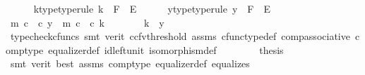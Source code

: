 \begin{isabellebody}
\ \ \ \ \isamarkupfalse%
\ k{\isacharunderscore}{\kern0pt}type{\isacharbrackleft}{\kern0pt}type{\isacharunderscore}{\kern0pt}rule{\isacharbrackright}{\kern0pt}{\isacharcolon}{\kern0pt}\ {\isachardoublequoteopen}k\ {\isacharcolon}{\kern0pt}\ F\ {\isasymrightarrow}\ E{\isacharprime}{\kern0pt}{\isachardoublequoteclose}\isanewline
\ \ \ \ \isamarkupfalse%
\ y{\isacharunderscore}{\kern0pt}type{\isacharbrackleft}{\kern0pt}type{\isacharunderscore}{\kern0pt}rule{\isacharbrackright}{\kern0pt}{\isacharcolon}{\kern0pt}\ {\isachardoublequoteopen}y\ {\isacharcolon}{\kern0pt}\ F\ {\isasymrightarrow}\ E{\isacharprime}{\kern0pt}{\isachardoublequoteclose}\isanewline
\ \ \ \ \isamarkupfalse%
\ {\isachardoublequoteopen}{\isacharparenleft}{\kern0pt}m\ {\isasymcirc}\isactrlsub c\ {\isasymphi}{\isacharparenright}{\kern0pt}\ {\isasymcirc}\isactrlsub c\ y\ {\isacharequal}{\kern0pt}\ {\isacharparenleft}{\kern0pt}m\ {\isasymcirc}\isactrlsub c\ {\isasymphi}{\isacharparenright}{\kern0pt}\ {\isasymcirc}\isactrlsub c\ k{\isachardoublequoteclose}\isanewline
\ \ \ \ \isamarkupfalse%
\ \isamarkupfalse%
\ {\isachardoublequoteopen}k\ {\isacharequal}{\kern0pt}\ y{\isachardoublequoteclose}\isanewline
\ \ \ \ \ \ \isamarkupfalse%
\ {\isacharparenleft}{\kern0pt}typecheck{\isacharunderscore}{\kern0pt}cfuncs{\isacharcomma}{\kern0pt}\ smt\ {\isacharparenleft}{\kern0pt}verit{\isacharcomma}{\kern0pt}\ ccfv{\isacharunderscore}{\kern0pt}threshold{\isacharparenright}{\kern0pt}\ assms{\isacharparenleft}{\kern0pt}{}{\isacharcomma}{\kern0pt}{}{\isacharcomma}{\kern0pt}{}{\isacharparenright}{\kern0pt}\ cfunc{\isacharunderscore}{\kern0pt}type{\isacharunderscore}{\kern0pt}def\ comp{\isacharunderscore}{\kern0pt}associative\ comp{\isacharunderscore}{\kern0pt}type\ equalizer{\isacharunderscore}{\kern0pt}def\ id{\isacharunderscore}{\kern0pt}left{\isacharunderscore}{\kern0pt}unit{}\ isomorphism{\isacharunderscore}{\kern0pt}def{\isacharparenright}{\kern0pt}\isanewline
\ \ \isamarkupfalse%
\isanewline
\ \ \isamarkupfalse%
\ \isamarkupfalse%
\ {\isacharquery}{\kern0pt}thesis\isanewline
\ \ \ \ \isamarkupfalse%
\ {\isacharparenleft}{\kern0pt}smt\ {\isacharparenleft}{\kern0pt}verit{\isacharcomma}{\kern0pt}\ best{\isacharparenright}{\kern0pt}\ assms{\isacharparenleft}{\kern0pt}{}{\isacharcomma}{\kern0pt}{}{\isacharcomma}{\kern0pt}{}{\isacharcomma}{\kern0pt}{}{\isacharparenright}{\kern0pt}\ comp{\isacharunderscore}{\kern0pt}type\ equalizer{\isacharunderscore}{\kern0pt}def\ equalizes{\isacharparenright}{\kern0pt}\isanewline

\end{isabellebody}
